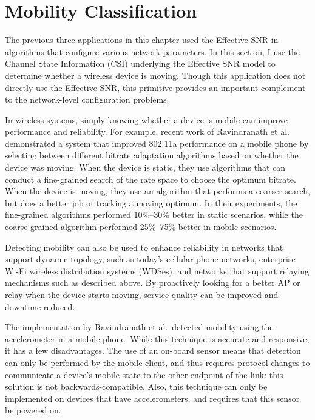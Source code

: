 \section{Mobility Classification}\label{sec:esnr_mobility}
The previous three applications in this chapter used the Effective SNR in algorithms that configure various network parameters. In this section, I use the Channel State Information (CSI) underlying the Effective SNR model to determine whether a wireless device is moving. Though this application does not directly use the Effective SNR, this primitive provides an important complement to the network-level configuration problems.

In wireless systems, simply knowing whether a device is mobile can improve performance and reliability. For example, recent work of Ravindranath et al.\ \cite{Ravindranath_SensorHints} demonstrated a system that improved 802.11a performance on a mobile phone by selecting between different bitrate adaptation algorithms based on whether the device was moving. When the device is static, they use algorithms that can conduct a fine-grained search of the rate space to choose the optimum bitrate. When the device is moving, they use an algorithm that performs a coarser search, but does a better job of tracking a moving optimum. In their experiments, the fine-grained algorithms performed 10\%--30\% better in static scenarios, while the coarse-grained algorithm performed 25\%--75\% better in mobile scenarios.

Detecting mobility can also be used to enhance reliability in networks that support dynamic topology, such as today's cellular phone networks, enterprise Wi-Fi wireless distribution systems (WDSes), and networks that support relaying mechanisms such as described above. By proactively looking for a better AP or relay when the device starts moving, service quality can be improved and downtime reduced. 

The implementation by Ravindranath et al.\ detected mobility using the accelerometer in a mobile phone. While this technique is accurate and responsive, it has a few disadvantages. The use of an on-board sensor means that detection can only be performed by the mobile client, and thus requires protocol changes to communicate a device's mobile state to the other endpoint of the link: this solution is not backwards-compatible. Also, this technique can only be implemented on devices that have accelerometers, and requires that this sensor be powered on.

